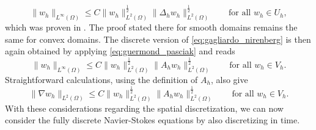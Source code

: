 \documentclass{m2an}
\begin{document}
\begin{equation*}
   \|w_h\|_{L^\infty(\Omega)} 
   \le C \|w_h\|_{L^2(\Omega)}^{ \frac{1}{2}} \|\Delta_h w_h\|_{L^2(\Omega)}^{ \frac{1}{2}}
   \qquad \text{for all } w_h \in U_h,
\end{equation*}
which was proven in \cite[Lemma 3.3]{hansbo_strong_2002}. The proof stated there for smooth domains 
remains the same for convex domains.
The discrete version of \eqref{eq:gagliardo_nirenberg} is then again obtained by applying
\eqref{eq:guermond_pasciak} and reads
\begin{equation}\label{eq:discrete_stokes_gagliardo_nirenberg}
   \|w_h\|_{L^\infty(\Omega)} \le C \|w_h\|_{L^2(\Omega)}^{\frac{1}{2}}\|A_h w_h\|_{L^2(\Omega)}^{\frac{1}{2}}
   \qquad \text{for all } w_h \in V_h.
\end{equation}
Straightforward calculations, using the definition of $A_h$, also  give
\begin{equation}\label{eq:discrete_h1_interpolation}
   \|\nabla w_h\|_{L^2(\Omega)} \le C \|w_h\|_{L^2(\Omega)}^{\frac{1}{2}}\|A_h w_h\|_{L^2(\Omega)}^{\frac{1}{2}}
   \qquad \text{for all } w_h \in V_h.
\end{equation}
With these considerations regarding
the spatial discretization, we can now consider the fully discrete
Navier-Stokes equations by also discretizing in time.
\end{document}
